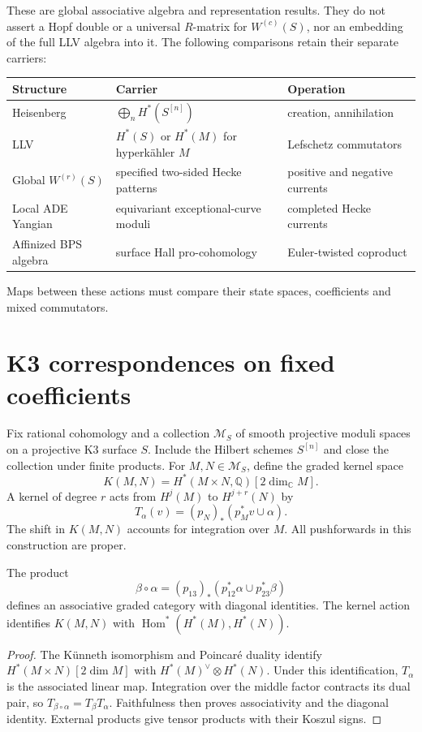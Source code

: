 These are global associative algebra and representation results.
They do not assert a Hopf double or a universal $R$-matrix for
$W^{(c)}(S)$, nor an embedding of the full LLV algebra into it.
The following comparisons retain their separate carriers:
\begin{center}
\small
\begin{tabularx}{0.98\textwidth}{@{}p{}XX@{}}
\toprule
Structure&Carrier&Operation\\\midrule
Heisenberg&$\bigoplus_nH^*(S^{[n]})$&creation, annihilation\\
LLV&$H^*(S)$ or $H^*(M)$ for hyperk\"ahler $M$&Lefschetz commutators\\
Global $W^{(r)}(S)$&specified two-sided Hecke patterns&positive and negative currents\\
Local ADE Yangian&equivariant exceptional-curve moduli&completed Hecke currents\\
Affinized BPS algebra&surface Hall pro-cohomology&Euler-twisted coproduct\\
\bottomrule
\end{tabularx}
\end{center}
Maps between these actions must compare their state spaces, coefficients
and mixed commutators.

\section{K3 correspondences on fixed coefficients}
Fix rational cohomology and a collection $\mathscr M_S$ of smooth
projective moduli spaces on a projective K3 surface $S$.
Include the Hilbert schemes $S^{[n]}$ and close the collection under
finite products.
For $M,N\in\mathscr M_S$, define the graded kernel space
\[
 K(M,N)=H^*(M\times N,\mathbb Q)[2\dim_{\mathbb C}M].
\]
A kernel of degree $r$ acts from $H^j(M)$ to $H^{j+r}(N)$ by
\[
 T_\alpha(v)=(p_N)_*(p_M^*v\cup\alpha).
\]
The shift in $K(M,N)$ accounts for integration over $M$.
All pushforwards in this construction are proper.

\begin{proposition}\label{cyiv:k3-kernels}
The product
\[
 \beta\circ\alpha=(p_{13})_*
 (p_{12}^*\alpha\cup p_{23}^*\beta)
\]
defines an associative graded category with diagonal identities.
The kernel action identifies $K(M,N)$ with
$\operatorname{Hom}^*(H^*(M),H^*(N))$.
\end{proposition}
\begin{proof}
The K\"unneth isomorphism and Poincar\'e duality identify
$H^*(M\times N)[2\dim M]$ with $H^*(M)^\vee\otimes H^*(N)$.
Under this identification, $T_\alpha$ is the associated linear map.
Integration over the middle factor contracts its dual pair, so
$T_{\beta\circ\alpha}=T_\beta T_\alpha$.
Faithfulness then proves associativity and the diagonal identity.
External products give tensor products with their Koszul signs.
\end{proof}

